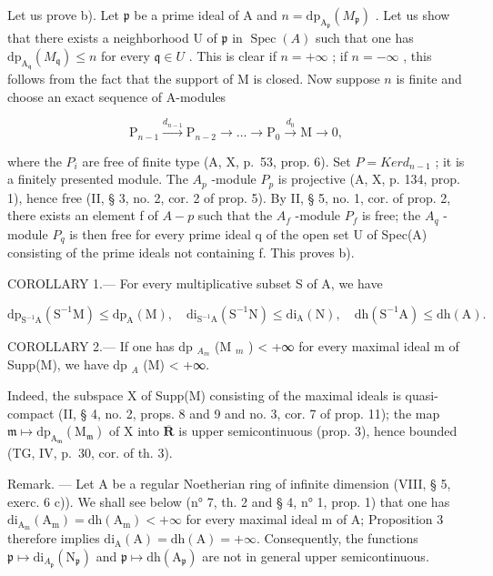 Let us prove b). Let \(\mathfrak{p}\) be a prime ideal of A and \(n = \mathrm{dp}_{\mathrm{A}_{\mathfrak{p}}}(M_{\mathfrak{p}})\) . Let us show that there exists a neighborhood U of \(\mathfrak{p}\) in \(\operatorname{Spec}(A)\) such that one has \(\mathrm{dp}_{\mathrm{A}_{\mathfrak{q}}}(M_{\mathfrak{q}}) \leqslant n\) for every \(\mathfrak{q} \in U\) . This is clear if \(n = +\infty\) ; if \(n = -\infty\) , this follows from the fact that the support of M is closed. Now suppose \(n\) is finite and choose an exact sequence of A-modules

\[
\mathrm{P} _ {n - 1} \stackrel {d _ {n - 1}} {\longrightarrow} \mathrm{P} _ {n - 2} \longrightarrow \dots \longrightarrow \mathrm{P} _ {0} \stackrel {d _ {0}} {\longrightarrow} \mathrm{M} \rightarrow 0,
\]

where the \(P_{i}\) are free of finite type (A, X, p.~53, prop. 6). Set \(P = Ker d_{n-1}\) ; it is a finitely presented module. The \(A_{p}\) -module \(P_{p}\) is projective (A, X, p. 134, prop. 1), hence free (II, § 3, no. 2, cor. 2 of prop. 5). By II, § 5, no. 1, cor. of prop. 2, there exists an element f of \(A - p\) such that the \(A_{f}\) -module \(P_{f}\) is free; the \(A_{q}\) -module \(P_{q}\) is then free for every prime ideal q of the open set U of Spec(A) consisting of the prime ideals not containing f. This proves b).

COROLLARY 1.--- For every multiplicative subset S of A, we have

\[
\mathrm{dp} _ {\mathrm{S} ^ {- 1} \mathrm{A}} (\mathrm{S} ^ {- 1} \mathrm{M}) \leqslant \mathrm{dp} _ {\mathrm{A}} (\mathrm{M}), \quad \mathrm{di} _ {\mathrm{S} ^ {- 1} \mathrm{A}} (\mathrm{S} ^ {- 1} \mathrm{N}) \leqslant \mathrm{di} _ {\mathrm{A}} (\mathrm{N}), \quad \mathrm{dh} (\mathrm{S} ^ {- 1} \mathrm{A}) \leqslant \mathrm{dh} (\mathrm{A}).
\]

COROLLARY 2.--- If one has dp \(_{A_m}\) (M \(_m\) ) \textless{} +∞ for every maximal ideal m of Supp(M), we have dp \(_A\) (M) \textless{} +∞.

Indeed, the subspace X of Supp(M) consisting of the maximal ideals is quasi-compact (II, § 4, no. 2, props. 8 and 9 and no. 3, cor. 7 of prop. 11); the map \(\mathfrak{m} \mapsto \mathrm{dp}_{\mathrm{A}_{\mathfrak{m}}}(\mathrm{M}_{\mathfrak{m}})\) of X into \(\overline{\mathbf{R}}\) is upper semicontinuous (prop. 3), hence bounded (TG, IV, p.~30, cor. of th. 3).

Remark. --- Let A be a regular Noetherian ring of infinite dimension (VIII, § 5, exerc. 6 c)). We shall see below (n° 7, th. 2 and § 4, n° 1, prop. 1) that one has \(\mathrm{di}_{\mathrm{A_m}}(\mathrm{A_m}) = \mathrm{dh}(\mathrm{A_m}) < +\infty\) for every maximal ideal m of A; Proposition 3 therefore implies \(\mathrm{di}_{\mathrm{A}}(\mathrm{A}) = \mathrm{dh}(\mathrm{A}) = +\infty\). Consequently, the functions \(\mathfrak{p} \mapsto \mathrm{di}_{A_{\mathfrak{p}}}(\mathrm{N}_{\mathfrak{p}})\) and \(\mathfrak{p} \mapsto \mathrm{dh}(\mathrm{A}_{\mathfrak{p}})\) are not in general upper semicontinuous.

